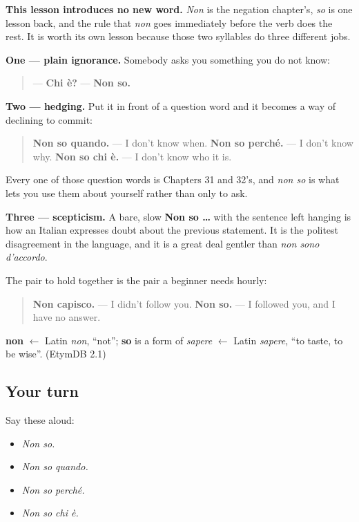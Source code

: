 \textbf{This lesson introduces no new word.} \emph{Non} is the negation chapter's, \emph{so} is one lesson back, and the rule that \emph{non} goes immediately before the verb does the rest. It is worth its own lesson because those two syllables do three different jobs.

\textbf{One — plain ignorance.} Somebody asks you something you do not know:

\begin{quote}
— \textbf{Chi è?} — \textbf{Non so.}
\end{quote}

\textbf{Two — hedging.} Put it in front of a question word and it becomes a way of declining to commit:

\begin{quote}
\textbf{Non so quando.} — I don't know when. \textbf{Non so perché.} — I don't know why. \textbf{Non so chi è.} — I don't know who it is.
\end{quote}

Every one of those question words is Chapters 31 and 32's, and \emph{non so} is what lets you use them about yourself rather than only to ask.

\textbf{Three — scepticism.} A bare, slow \textbf{Non so …} with the sentence left hanging is how an Italian expresses doubt about the previous statement. It is the politest disagreement in the language, and it is a great deal gentler than \emph{non sono d'accordo}.

The pair to hold together is the pair a beginner needs hourly:

\begin{quote}
\textbf{Non capisco.} — I didn't follow you. \textbf{Non so.} — I followed you, and I have no answer.
\end{quote}

\begin{cousinweb}
\textbf{non} $\leftarrow$ Latin \emph{non}, \textquotedblleft{}not\textquotedblright{}; \textbf{so} is a form of \emph{sapere} $\leftarrow$ Latin \emph{sapere}, \textquotedblleft{}to taste, to be wise\textquotedblright{}. (EtymDB 2.1)
\end{cousinweb}

\subsection*{Your turn}
Say these aloud:

\begin{itemize}
\raggedright
  \item \emph{Non so.}
  \item \emph{Non so quando.}
  \item \emph{Non so perché.}
  \item \emph{Non so chi è.}
\end{itemize}

